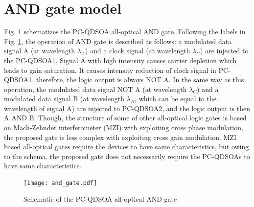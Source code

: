 \documentclass[twocolumn]{el-author}
\begin{document}
\section{AND gate model}
Fig. {\ref{fig:and_gate}} schematizes the PC-QDSOA all-optical AND gate. Following the labels in Fig. {\ref{fig:and_gate}}, the operation of AND gate is described as follows: a modulated data signal A (at wavelength $\lambda_{A}$) and a clock signal (at wavelength $\lambda_{C}$) are injected to the PC-QDSOA1. Signal A with high intensity causes carrier depletion which leads to gain saturation. It causes intensity reduction of clock signal in PC-QDSOA1, therefore, the logic output is always NOT A. In the same way as this operation, the modulated data signal NOT A (at wavelength $\lambda_{C}$) and a modulated data signal B (at wavelength $\lambda_{B}$, which can be equal to the wavelength of signal A) are injected to PC-QDSOA2, and the logic output is then A AND B. Though, the structure of some of other all-optical logic gates is based on Mach-Zehnder interferometer (MZI) {\cite{mzi_gate}} with exploiting cross phase modulation, the proposed gate is less complex with exploiting cross gain modulation. MZI based all-optical gates require the devices to have same characteristics, but owing to the schema, the proposed gate does not necessarily require the PC-QDSOAs to have same characteristics.

\begin{figure}[htbp]
\begin{center}
  \texttt{[image: and\_gate.pdf]}
  \caption{Schematic of the PC-QDSOA all-optical AND gate}
  \label{fig:and_gate}
\end{center}
\end{figure}
\end{document}
